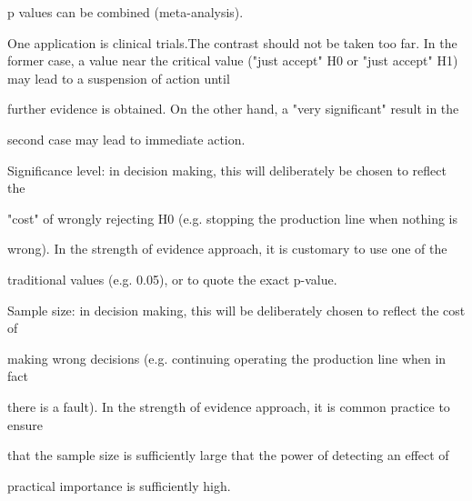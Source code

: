 p values can be combined (meta-analysis).

 

One application is clinical trials.The contrast should not be taken too far. In the former case, a value near the critical value ("just accept" H0 or "just accept" H1) may lead to a suspension of action until

further evidence is obtained. On the other hand, a "very significant" result in the

second case may lead to immediate action.
\newpage
 

Significance level: in decision making, this will deliberately be chosen to reflect the

"cost" of wrongly rejecting H0 (e.g. stopping the production line when nothing is

wrong). In the strength of evidence approach, it is customary to use one of the

traditional values (e.g. 0.05), or to quote the exact p-value.

 

Sample size: in decision making, this will be deliberately chosen to reflect the cost of

making wrong decisions (e.g. continuing operating the production line when in fact

there is a fault). In the strength of evidence approach, it is common practice to ensure

that the sample size is sufficiently large that the power of detecting an effect of

practical importance is sufficiently high.


  
 
